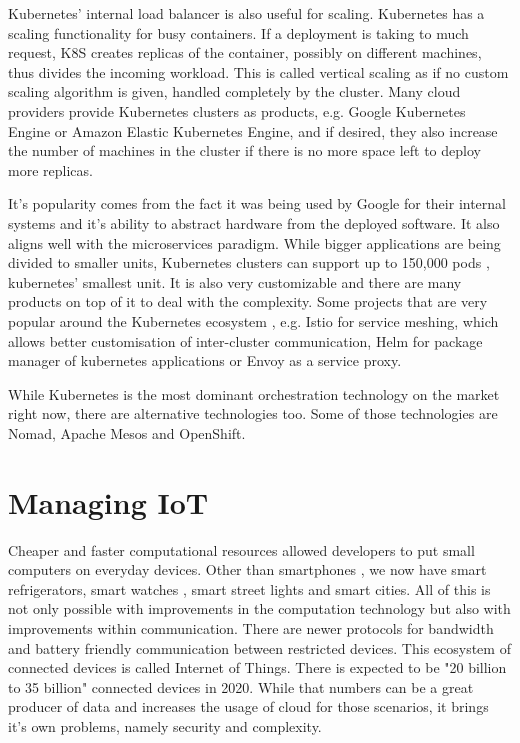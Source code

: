 Kubernetes' internal load balancer is also useful for scaling. Kubernetes has a scaling functionality for busy containers. If a deployment is taking to much request, K8S creates replicas of the container, possibly on different machines, thus divides the incoming workload. This is called vertical scaling as if no custom scaling algorithm is given, handled completely by the cluster. Many cloud providers provide Kubernetes clusters as products, e.g. Google Kubernetes Engine or Amazon Elastic Kubernetes Engine, and if desired, they also increase the number of machines in the cluster if there is no more space left to deploy more replicas.

It's popularity comes from the fact it was being used by Google for their internal systems and it's ability to abstract hardware from the deployed software. It also aligns well with the microservices paradigm. While bigger applications are being divided to smaller units, Kubernetes clusters can support up to 150,000 pods \cite{kubernetes-load}, kubernetes' smallest unit. It is also very customizable and there are many products on top of it to deal with the complexity. Some projects that are very popular around the Kubernetes ecosystem , e.g. Istio \cite{istio} for service meshing, which allows better customisation of inter-cluster communication, Helm \cite{helm} for package manager of kubernetes applications or Envoy \cite{envoy} as a service proxy.

While Kubernetes is the most dominant orchestration technology on the market right now, there are alternative technologies too. Some of those technologies are Nomad, Apache Mesos and OpenShift.

\newpage
\section{Managing IoT}
Cheaper and faster computational resources allowed developers to put small computers on everyday devices. Other than smartphones , we now have smart refrigerators, smart watches , smart street lights and smart cities. All of this is not only possible with improvements in the computation technology but also with improvements within communication. There are newer protocols for bandwidth and battery friendly communication between restricted devices. This ecosystem of connected devices is called Internet of Things. There is expected to be "20 billion to 35 billion"\cite{unikernels-improve} connected devices in 2020. While that numbers can be a great producer of data and increases the usage of cloud for those scenarios, it brings it's own problems, namely security and complexity.

